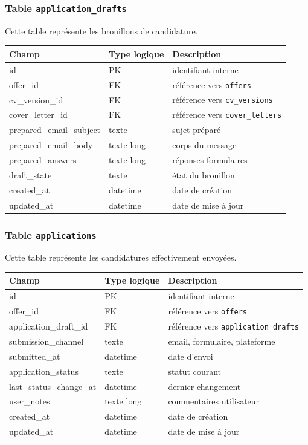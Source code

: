 \documentclass[11pt,a4paper]{article}
\begin{document}
\subsubsection{Table \texttt{application\_drafts}}

Cette table représente les brouillons de candidature.

\begin{center}
\begin{tabular}{|l|l|l|}
\hline
\textbf{Champ} & \textbf{Type logique} & \textbf{Description} \\
\hline
id & PK & identifiant interne \\
offer_id & FK & référence vers \texttt{offers} \\
cv_version_id & FK & référence vers \texttt{cv\_versions} \\
cover_letter_id & FK & référence vers \texttt{cover\_letters} \\
prepared_email_subject & texte & sujet préparé \\
prepared_email_body & texte long & corps du message \\
prepared_answers & texte long & réponses formulaires \\
draft_state & texte & état du brouillon \\
created_at & datetime & date de création \\
updated_at & datetime & date de mise à jour \\
\hline
\end{tabular}
\end{center}

\subsubsection{Table \texttt{applications}}

Cette table représente les candidatures effectivement envoyées.

\begin{center}
\begin{tabular}{|l|l|l|}
\hline
\textbf{Champ} & \textbf{Type logique} & \textbf{Description} \\
\hline
id & PK & identifiant interne \\
offer_id & FK & référence vers \texttt{offers} \\
application_draft_id & FK & référence vers \texttt{application\_drafts} \\
submission_channel & texte & email, formulaire, plateforme \\
submitted_at & datetime & date d’envoi \\
application_status & texte & statut courant \\
last_status_change_at & datetime & dernier changement \\
user_notes & texte long & commentaires utilisateur \\
created_at & datetime & date de création \\
updated_at & datetime & date de mise à jour \\
\hline
\end{tabular}
\end{center}
\end{document}
